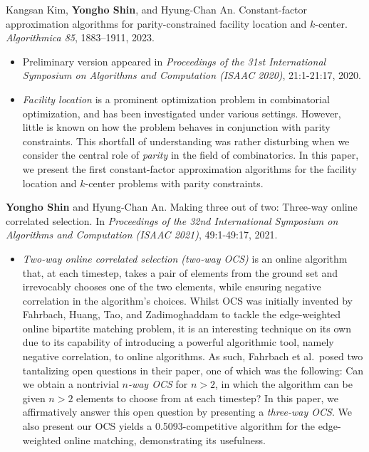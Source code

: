 \documentclass{article}
\newcommand{\killinitspace}{-0.7em}
\begin{document}
Kangsan Kim, \textbf{Yongho Shin}, and Hyung-Chan An. Constant-factor approximation algorithms for parity-constrained facility location and $k$-center. \emph{Algorithmica 85}, 1883–1911, 2023.
\vspace{\killinitspace}
\begin{itemize}
\item Preliminary version appeared in \emph{Proceedings of the 31st International Symposium on Algorithms and Computation (ISAAC 2020)}, 21:1-21:17, 2020.
\item \emph{Facility location} is a prominent optimization problem in combinatorial optimization, and has been investigated under various settings. However, little is known on how the problem behaves in conjunction with parity constraints. This shortfall of understanding was rather disturbing when we consider the central role of \emph{parity} in the field of combinatorics. In this paper, we present the first constant-factor approximation algorithms for the facility location and $k$-center problems with parity constraints.
\end{itemize}

\textbf{Yongho Shin} and Hyung-Chan An. Making three out of two: Three-way online correlated selection. In \emph{Proceedings of the 32nd International Symposium on Algorithms and Computation (ISAAC 2021)}, 49:1-49:17, 2021.
\vspace{\killinitspace}
\begin{itemize}
\item \emph{Two-way online correlated selection (two-way OCS)} is an online algorithm that, at each timestep, takes a pair of elements from the ground set and irrevocably chooses one of the two elements, while ensuring negative correlation in the algorithm's choices. Whilst OCS was initially invented by Fahrbach, Huang, Tao, and Zadimoghaddam to tackle the edge-weighted online bipartite matching problem, it is an interesting technique on its own due to its capability of introducing a powerful algorithmic tool, namely negative correlation, to online algorithms. As such, Fahrbach et al.~posed two tantalizing open questions in their paper, one of which was the following: Can we obtain a nontrivial \emph{$n$-way OCS} for $n>2$, in which the algorithm can be given $n>2$ elements to choose from at each timestep? In this paper, we affirmatively answer this open question by presenting a \emph{three-way OCS}. We also present our OCS yields a 0.5093-competitive algorithm for the edge-weighted online matching, demonstrating its usefulness.
\end{itemize}
\end{document}
